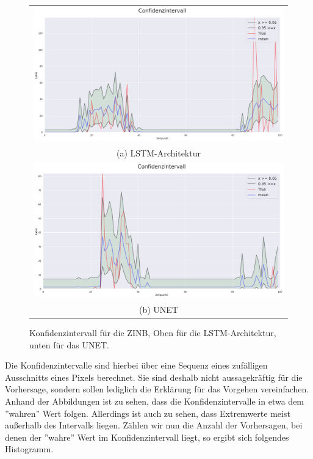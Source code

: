 \begin{figure}[h]
\centering
\begin{tabular}{c}
\includegraphics[width=120mm]{abb/quantile_LSTM.png}\\
(a) \small{LSTM-Architektur}\\
\includegraphics[width=120mm]{abb/quantile_UNET.png}\\
(b) \small{UNET}
\end{tabular}
\caption{Konfidenzintervall für die ZINB, Oben für die LSTM-Architektur, unten für das UNET. \label{fig:konfidenzintervall}}
\end{figure}

\noindent Die Konfidenzintervalle sind hierbei über eine Sequenz eines zufälligen Ausschnitts eines Pixels berechnet. Sie sind deshalb nicht aussagekräftig für die Vorhersage, sondern sollen lediglich die Erklärung für das Vorgehen vereinfachen. Anhand der Abbildungen ist zu sehen, dass die Konfidenzintervalle in etwa dem ''wahren'' Wert folgen. Allerdings ist auch zu sehen, dass Extremwerte meist außerhalb des Intervalls liegen. Zählen wir nun die Anzahl der Vorhersagen, bei denen der ''wahre'' Wert im Konfidenzintervall liegt, so ergibt sich folgendes Histogramm.\\


